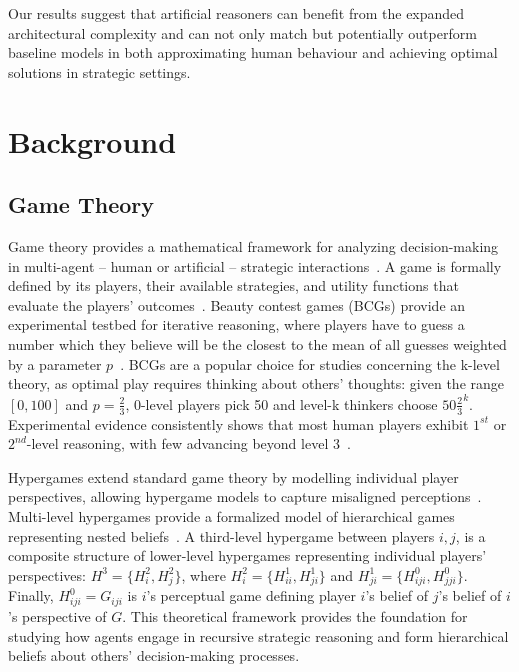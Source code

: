 \documentclass[runningheads]{llncs}
\begin{document}
Our results suggest that artificial reasoners can benefit from the expanded architectural complexity and can not only match but potentially outperform baseline models in both approximating human behaviour and achieving optimal solutions in strategic settings.

\section{Background}

\subsection{Game Theory}

Game theory provides a mathematical framework for analyzing decision-making in multi-agent -- human or artificial -- strategic interactions~\cite{Osborne2004}. A game is formally defined by its players, their available strategies, and utility functions that evaluate the players' outcomes~\cite{Rasmusen2006introtogametheory}. Beauty contest games (BCGs) provide an experimental testbed for iterative reasoning, where players have to guess a number which they believe will be the closest to the mean of all guesses weighted by a parameter $p$~\cite{camerer2004cognitive}. BCGs are a popular choice for studies concerning the k-level theory, as optimal play requires thinking about others' thoughts: given the range $[0,100]$ and $p=\frac{2}{3}$, 0-level players pick 50 and level-k thinkers choose $50\frac{2}{3}^k$. Experimental evidence consistently shows that most human players exhibit $1^{st}$ or $2^{nd}$-level reasoning, with few advancing beyond level 3~\cite{nagel95,duffy1997robustness,bosch2002one}.

Hypergames extend standard game theory by modelling individual player perspectives, allowing hypergame models to capture misaligned perceptions~\cite{Bennett1977}. Multi-level hypergames provide a formalized model of hierarchical games representing nested beliefs~\cite{Wang1988}. A third-level hypergame between players $i,j$, is a composite structure of lower-level hypergames representing individual players' perspectives: $H^3=\{H^2_i,H^2_j\}$, where $H^2_i=\{H^1_{ii},H^1_{ji}\}$ and $H^1_{ji}=\{H^0_{iji},H^0_{jji}\}$. Finally, $H^0_{iji}=G_{iji}$ is $i$'s perceptual game defining player $i$'s belief of $j$'s belief of $i$'s perspective of $G$. This theoretical framework provides the foundation for studying how agents engage in recursive strategic reasoning and form hierarchical beliefs about others' decision-making processes.
\end{document}
